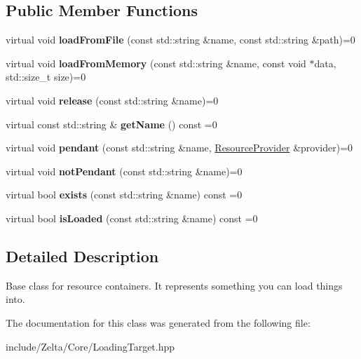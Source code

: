 \subsection*{Public Member Functions}
\begin{DoxyCompactItemize}
\item 
\mbox{\label{classzt_1_1_loading_target_ab83041e95e2f3584af0e2ce726528246}} 
virtual void {\bfseries load\+From\+File} (const std\+::string \&name, const std\+::string \&path)=0
\item 
\mbox{\label{classzt_1_1_loading_target_a9f5edbd26bb353be24d7cf0c862f62b3}} 
virtual void {\bfseries load\+From\+Memory} (const std\+::string \&name, const void $\ast$data, std\+::size\+\_\+t size)=0
\item 
\mbox{\label{classzt_1_1_loading_target_afa0e97a98e68d1b55689498e15513d9e}} 
virtual void {\bfseries release} (const std\+::string \&name)=0
\item 
\mbox{\label{classzt_1_1_loading_target_a1e325d02640f2f80d1a11fb06d9cc154}} 
virtual const std\+::string \& {\bfseries get\+Name} () const =0
\item 
\mbox{\label{classzt_1_1_loading_target_a90f011dd3aac3369ada59a3776e8e598}} 
virtual void {\bfseries pendant} (const std\+::string \&name, \hyperlink{classzt_1_1_resource_provider}{Resource\+Provider} \&provider)=0
\item 
\mbox{\label{classzt_1_1_loading_target_aef330cfe486b1927b7b4c155b36043f2}} 
virtual void {\bfseries not\+Pendant} (const std\+::string \&name)=0
\item 
\mbox{\label{classzt_1_1_loading_target_afb1845a9d49b2d5f0e01d1688405a479}} 
virtual bool {\bfseries exists} (const std\+::string \&name) const =0
\item 
\mbox{\label{classzt_1_1_loading_target_a42246fda572f1c00c52e3fed55209d0b}} 
virtual bool {\bfseries is\+Loaded} (const std\+::string \&name) const =0
\end{DoxyCompactItemize}


\subsection{Detailed Description}
Base class for resource containers. It represents something you can load things into. 

The documentation for this class was generated from the following file\+:\begin{DoxyCompactItemize}
\item 
include/\+Zelta/\+Core/Loading\+Target.\+hpp\end{DoxyCompactItemize}
